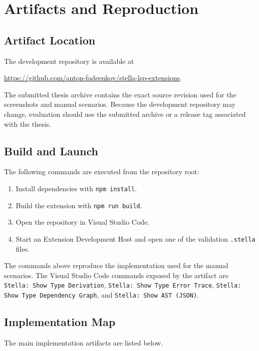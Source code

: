 ﻿\appendix
\chapter{Artifacts and Reproduction}
\label{app:artifacts}
\sloppy

\section{Artifact Location}

The development repository is available at
\begin{center}
\url{https://github.com/anton-fadeenkov/stella-lsp-extensions}.
\end{center}

The submitted thesis archive contains the exact source revision used for the screenshots and manual scenarios. Because the development repository may change, evaluation should use the submitted archive or a release tag associated with the thesis.

\section{Build and Launch}

The following commands are executed from the repository root:

\begin{enumerate}
    \item Install dependencies with \texttt{npm install}.
    \item Build the extension with \texttt{npm run build}.
    \item Open the repository in Visual Studio Code.
    \item Start an Extension Development Host and open one of the validation \texttt{.stella} files.
\end{enumerate}

The commands above reproduce the implementation used for the manual scenarios. The Visual Studio Code commands exposed by the artifact are \texttt{Stella: Show Type Derivation}, \texttt{Stella: Show Type Error Trace}, \texttt{Stella: Show Type Dependency Graph}, and \texttt{Stella: Show AST (JSON)}.

\section{Implementation Map}

The main implementation artifacts are listed below.

